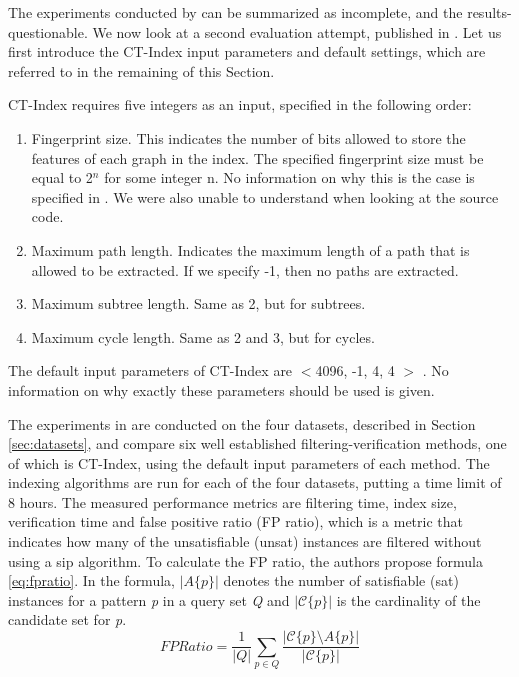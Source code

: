 \documentclass{l4proj}
\newcommand{\fancyC}{\mathcal{C}}
\begin{document}
The experiments conducted by \cite{ctindex} can be summarized as incomplete, and the results- questionable. We now look at a second evaluation attempt, published in \cite{foteini}. Let us first introduce the CT-Index input parameters and default settings, which are referred to in the remaining of this Section.

CT-Index requires five integers as an input, specified in the following order:
\begin{enumerate}
\item Fingerprint size. This indicates the number of bits allowed to store the features of each graph in the index. The specified fingerprint size must be equal to 2$^{n}$ for some integer n. No information on why this is the case is specified in \cite{ctindex}. We were also unable to understand when looking at the source code.
\item Maximum path length. Indicates the maximum length of a path that is allowed to be extracted. If we specify -1, then no paths are extracted.
\item Maximum subtree length. Same as 2, but for subtrees.
\item Maximum cycle length. Same as 2 and 3, but for cycles.
\end{enumerate}

The default input parameters of CT-Index are $<$4096, -1, 4, 4 $>$ \cite{ctindex, foteini}. No information on why exactly these parameters should be used is given.

The experiments in \cite{foteini} are conducted on the four datasets, described in Section \ref{sec:datasets}, and compare six well established filtering-verification methods, one of which is CT-Index, using the default input parameters of each method. The indexing algorithms are run for each of the four datasets, putting a time limit of 8 hours. The measured performance metrics are filtering time, index size, verification time and false positive ratio (FP ratio), which is a metric that indicates how many of the unsatisfiable (\gls{unsat}) instances are filtered without using a \gls{sip} algorithm. To calculate the FP ratio, the authors propose formula \ref{eq:fpratio}. In the formula, \emph{$|A\{p\}|$} denotes the number of satisfiable (\gls{sat}) instances for a pattern \emph{p} in a query set \emph{Q} and \emph{$|\fancyC\{p\}|$} is the cardinality of the candidate set for \emph{p}.
\begin{equation}
\label{eq:fpratio}
FP Ratio = \frac{1}{|Q|} \sum_{p \in Q} \frac{|\fancyC\{p\} \setminus A\{p\}|}{|\fancyC\{p\}|}
\end{equation}
\end{document}
